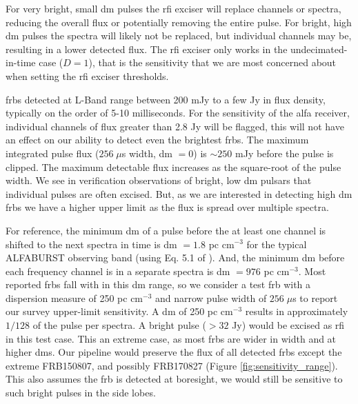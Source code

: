 \documentclass[a4paper,fleqn,usenatbib]{mnras}
\begin{document}
For very bright, small \gls{dm} pulses the \gls{rfi} exciser will replace
channels or spectra, reducing the overall flux or potentially removing the
entire pulse.  For bright, high \gls{dm} pulses the spectra will likely not be
replaced, but individual channels may be, resulting in a lower detected flux.
The \gls{rfi} exciser only works in the undecimated-in-time case ($D=1$), that
is the sensitivity that we are most concerned about when setting the \gls{rfi}
exciser thresholds.

\glspl{frb} detected at L-Band range between 200 mJy to a few Jy in flux
density, typically on the order of 5-10 milliseconds. For the sensitivity of the
\gls{alfa} receiver, individual channels of flux greater than 2.8 Jy will be
flagged, this will not have an effect on our ability to detect even the
brightest \glspl{frb}.  The maximum integrated pulse flux ($256 \; \mu$s width,
\gls{dm} $=0$) is $\sim250$ mJy before the pulse is clipped. The maximum
detectable flux increases as the square-root of the pulse width.  We see in
verification observations of bright, low \gls{dm} pulsars that individual
pulses are often excised. But, as we are interested in detecting high \gls{dm}
\glspl{frb} we have a higher upper limit as the flux is spread over multiple
spectra.

For reference, the minimum \gls{dm} of a pulse before the at least one channel
is shifted to the next spectra in time is \gls{dm} $=1.8$ pc cm$^{-3}$ for the
typical ALFABURST observing band (using Eq. 5.1 of \cite{2004hpa..book.....L}).
And, the minimum \gls{dm} before each frequency channel is in a separate spectra
is \gls{dm} $=976$ pc cm$^{-3}$. Most reported \glspl{frb} fall with in this
\gls{dm} range, so we consider a test \gls{frb} with a dispersion measure of 250
pc cm$^{-3}$ and narrow pulse width of $256 \; \mu$s to report our survey
upper-limit sensitivity. A \gls{dm} of 250 pc cm$^{-3}$ results in approximately
$1/128$ of the pulse per spectra. A bright pulse ($>32$ Jy) would be excised as
\gls{rfi} in this test case. This an extreme case, as most \glspl{frb} are wider
in width and at higher \glspl{dm}.  Our pipeline would preserve the flux of all
detected \glspl{frb} except the extreme FRB150807, and possibly FRB170827
(Figure \ref{fig:sensitivity_range}).  This also assumes the \gls{frb} is
detected at boresight, we would still be sensitive to such bright pulses in the
side lobes.
\end{document}
